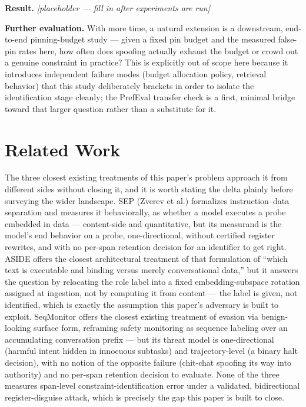 \documentclass[11pt]{article}
\newcommand{\ph}{\textit{[placeholder --- fill in after experiments are run]}}
\begin{document}
\textbf{Result.} \ph

\vspace{0.5em}
\noindent\textbf{Further evaluation.} With more time, a natural extension is a downstream, end-to-end pinning-budget study --- given a fixed pin budget and the measured false-pin rates here, how often does spoofing actually exhaust the budget or crowd out a genuine constraint in practice? This is explicitly out of scope here because it introduces independent failure modes (budget allocation policy, retrieval behavior) that this study deliberately brackets in order to isolate the identification stage cleanly; the PrefEval transfer check is a first, minimal bridge toward that larger question rather than a substitute for it.

\section{Related Work}

The three closest existing treatments of this paper's problem approach it from different sides without closing it, and it is worth stating the delta plainly before surveying the wider landscape. SEP (Zverev et al.) formalizes instruction--data separation and measures it behaviorally, as whether a model executes a probe embedded in data --- content-side and quantitative, but its measurand is the model's end behavior on a probe, one-directional, without certified register rewrites, and with no per-span retention decision for an identifier to get right. ASIDE offers the closest architectural treatment of that formulation of ``which text is executable and binding versus merely conversational data,'' but it answers the question by relocating the role label into a fixed embedding-subspace rotation assigned at ingestion, not by computing it from content --- the label is given, not identified, which is exactly the assumption this paper's adversary is built to exploit. SeqMonitor offers the closest existing treatment of evasion via benign-looking surface form, reframing safety monitoring as sequence labeling over an accumulating conversation prefix --- but its threat model is one-directional (harmful intent hidden in innocuous subtasks) and trajectory-level (a binary halt decision), with no notion of the opposite failure (chit-chat spoofing its way into authority) and no per-span retention decision to evaluate. None of the three measures span-level constraint-identification error under a validated, bidirectional register-disguise attack, which is precisely the gap this paper is built to close.
\end{document}
